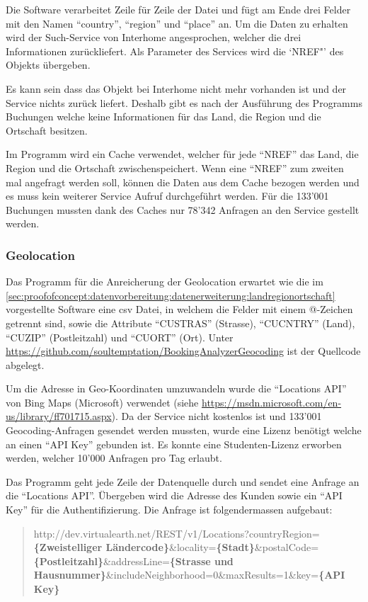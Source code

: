 Die Software verarbeitet Zeile für Zeile der Datei und fügt am Ende drei Felder mit den Namen "`country"', "`region"' und "`place"' an. Um die Daten zu erhalten wird der Such-Service von Interhome angesprochen, welcher die drei Informationen zurückliefert. Als Parameter des Services wird die `NREF"' des Objekts übergeben. 

Es kann sein dass das Objekt bei Interhome nicht mehr vorhanden ist und der Service nichts zurück liefert. Deshalb gibt es nach der Ausführung des Programms Buchungen welche keine Informationen für das Land, die Region und die Ortschaft besitzen.

Im Programm wird ein Cache verwendet, welcher für jede "`NREF"' das Land, die Region und die Ortschaft zwischenspeichert. Wenn eine "`NREF"' zum zweiten mal angefragt werden soll, können die Daten aus dem Cache bezogen werden und es muss kein weiterer Service Aufruf durchgeführt werden. Für die 133'001 Buchungen mussten dank des Caches nur 78'342 Anfragen an den Service gestellt werden.

\subsubsection{Geolocation}
\label{sec:proofofconcept:datenvorbereitung:datenerweiterung:geolocation}
Das Programm für die Anreicherung der Geolocation erwartet wie die im \cref{sec:proofofconcept:datenvorbereitung:datenerweiterung:landregionortschaft} vorgestellte Software eine \gls{csv} Datei, in welchem die Felder mit einem @-Zeichen getrennt sind, sowie die Attribute "`CUSTRAS"' (Strasse), "`CUCNTRY"' (Land), "`CUZIP"' (Postleitzahl) und "`CUORT"' (Ort). Unter \url{https://github.com/soultemptation/BookingAnalyzerGeocoding} ist der Quellcode abgelegt. 

Um die Adresse in Geo-Koordinaten umzuwandeln wurde die "`Locations API"' von Bing Maps (Microsoft) verwendet (siehe \url{https://msdn.microsoft.com/en-us/library/ff701715.aspx}). Da der Service nicht kostenlos ist und 133'001 Geocoding-Anfragen gesendet werden mussten, wurde eine Lizenz benötigt welche an einen "`API Key"' gebunden ist. Es konnte eine Studenten-Lizenz erworben werden, welcher 10'000 Anfragen pro Tag erlaubt.

Das Programm geht jede Zeile der Datenquelle durch und sendet eine Anfrage an die "`Locations API"'. Übergeben wird die Adresse des Kunden sowie ein "`API Key"' für die Authentifizierung. Die Anfrage ist folgendermassen aufgebaut:

\blockquote[]{http://dev.virtualearth.net/REST/v1/Locations?countryRegion=\textbf{\{Zweistelliger Ländercode\}}\&locality=\textbf{\{Stadt\}}\&postalCode=\textbf{\{Postleitzahl\}}\&addressLine=\textbf{\{Strasse und Hausnummer\}}\&includeNeighborhood=0\&maxResults=1\&key=\textbf{\{API Key\}}}

